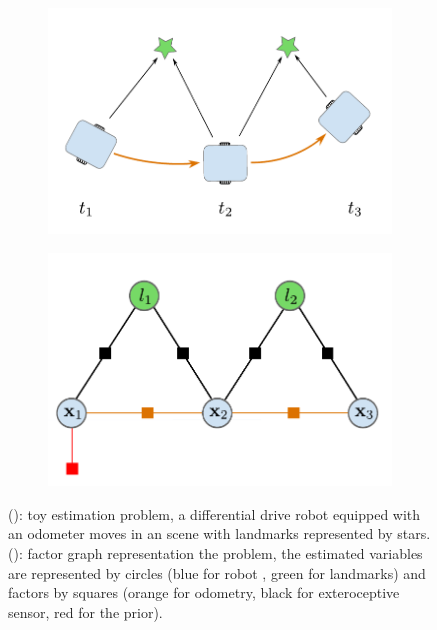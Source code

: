 \begin{figure}[h]
    \centering
    \begin{subfigure}{.49\linewidth}
        \centering
        \includegraphics[width=\textwidth]{figures/toy_example.pdf}
        \caption{\label{fig:toy_problem}}
    \end{subfigure}%
    \hfill
    \begin{subfigure}{.49\linewidth}
        \centering
        \includegraphics[width=\textwidth]{figures/toy_factor.pdf}
        \caption{\label{fig:toy_factor}}
    \end{subfigure}%
    \caption{(): toy estimation problem, a differential drive robot equipped with an odometer moves in 
    an scene with landmarks represented by stars. (): factor graph representation the problem, the estimated variables are represented by circles 
    (blue for robot \keyframes, green for landmarks) and factors by squares (orange for odometry, black for exteroceptive sensor, red for the prior).}
\end{figure}

